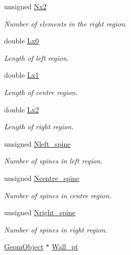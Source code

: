 \begin{DoxyCompactItemize}
unsigned \hyperlink{classoomph_1_1ChannelSpineMesh_a46534250de6f75890463bfddefdb39cd}{Nx2}
\begin{DoxyCompactList}\small\item\em Number of elements in the right region. \end{DoxyCompactList}\item 
double \hyperlink{classoomph_1_1ChannelSpineMesh_a3d61af363a8da156f4fe6d10e62f73c6}{Lx0}
\begin{DoxyCompactList}\small\item\em Length of left region. \end{DoxyCompactList}\item 
double \hyperlink{classoomph_1_1ChannelSpineMesh_a35f5d840478b2b93199a393cbdb50f2d}{Lx1}
\begin{DoxyCompactList}\small\item\em Length of centre region. \end{DoxyCompactList}\item 
double \hyperlink{classoomph_1_1ChannelSpineMesh_a4c295478a3f79335f5d0113da220844e}{Lx2}
\begin{DoxyCompactList}\small\item\em Length of right region. \end{DoxyCompactList}\item 
unsigned \hyperlink{classoomph_1_1ChannelSpineMesh_a56fbad56271c5e37cd7f1d2de7b7bb36}{Nleft\+\_\+spine}
\begin{DoxyCompactList}\small\item\em Number of spines in left region. \end{DoxyCompactList}\item 
unsigned \hyperlink{classoomph_1_1ChannelSpineMesh_af6ef1bb007083a803561e5f0062f820b}{Ncentre\+\_\+spine}
\begin{DoxyCompactList}\small\item\em Number of spines in centre region. \end{DoxyCompactList}\item 
unsigned \hyperlink{classoomph_1_1ChannelSpineMesh_a56f7259d8e5dee66a8c83ffe99526c62}{Nright\+\_\+spine}
\begin{DoxyCompactList}\small\item\em Number of spines in right region. \end{DoxyCompactList}\item 
\hyperlink{classoomph_1_1GeomObject}{Geom\+Object} $\ast$ \hyperlink{classoomph_1_1ChannelSpineMesh_adaa23badd05b69c905b444bd9141b3a7}{Wall\+\_\+pt}

\end{DoxyCompactItemize}
